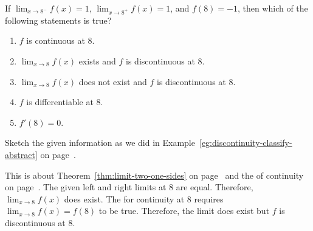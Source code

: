 \documentclass[../main.tex]{subfiles}
\begin{document}
\begin{exercise} \label{ex:midterm-exercise-8}
  If \(\lim_{x \to 8^{-}} f(x) = 1\), \(\lim_{x \to 8^{+}} f(x) = 1\), and \(f(8) = -1\), then which of the following statements is true?
  \begin{enumerate}[label=\Alph*.]
    \item \(f\) is continuous at \(8\).
    \item \(\lim_{x \to 8} f(x)\) exists and \(f\) is discontinuous at \(8\).
    \item \(\lim_{x \to 8} f(x)\) does not exist and \(f\) is discontinuous at \(8\).
    \item \(f\) is differentiable at \(8\).
    \item \(f'(8) = 0\).
  \end{enumerate}

  \begin{hint}
    Sketch the given information as we did in Example~\ref{eg:discontinuity-classify-abstract} on page~\pageref{eg:discontinuity-classify-abstract}.
  \end{hint}

  \begin{solution}
    This is about Theorem~\ref{thm:limit-two-one-sides} on page~\pageref{thm:limit-two-one-sides} and the  of continuity on page~\pageref{def:continuity}. The given left and right limits at \(8\) are equal. Therefore, \(\lim_{x \to 8} f(x)\) does exist. The  for continuity at \(8\) requires \(\lim_{x \to 8} f(x) = f(8)\) to be true.  Therefore, the limit does exist but \(f\) is discontinuous at \(8\).
  \end{solution}
\end{exercise}
\vfill
\clearpage
\end{document}
